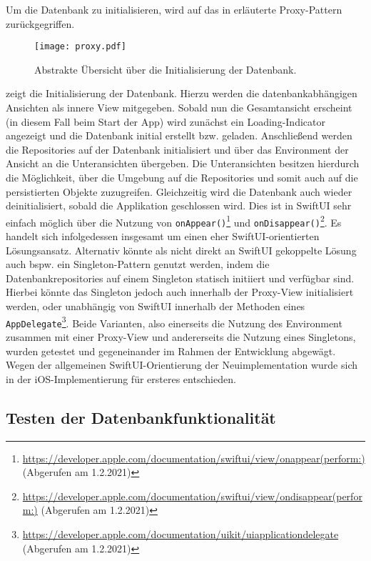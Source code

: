 Um die Datenbank zu initialisieren, wird auf das in  erläuterte Proxy-Pattern zurückgegriffen.

\begin{figure}[H]
\texttt{[image: proxy.pdf]}
\caption{Abstrakte Übersicht über die Initialisierung der Datenbank.}\label{fig:proxy}
\end{figure}

\noindent {} zeigt die Initialisierung der Datenbank. Hierzu werden die datenbankabhängigen Ansichten als innere View mitgegeben. Sobald nun die Gesamtansicht erscheint (in diesem Fall beim Start der App) wird zunächst ein Loading-Indicator angezeigt und die Datenbank initial erstellt bzw. geladen.  Anschließend werden die Repositories auf der Datenbank initialisiert und über das Environment der Ansicht an die Unteransichten übergeben. Die Unteransichten besitzen hierdurch die Möglichkeit, über die Umgebung auf die Repositories und somit auch auf die persistierten Objekte zuzugreifen. Gleichzeitig wird die Datenbank auch wieder deinitialisiert, sobald die Applikation geschlossen wird. Dies ist in SwiftUI sehr einfach möglich über die Nutzung von \texttt{onAppear()}\footnote{\url{https://developer.apple.com/documentation/swiftui/view/onappear(perform:)} (Abgerufen am 1.2.2021)} und \texttt{onDisappear()}\footnote{\url{https://developer.apple.com/documentation/swiftui/view/ondisappear(perform:)} (Abgerufen am 1.2.2021)}. Es handelt sich infolgedessen insgesamt um einen eher SwiftUI-orientierten Lösungsansatz. Alternativ könnte als nicht direkt an SwiftUI gekoppelte Lösung auch bspw. ein Singleton-Pattern genutzt werden, indem die Datenbankrepositories auf einem Singleton statisch initiiert und verfügbar sind. Hierbei könnte das Singleton jedoch auch innerhalb der Proxy-View initialisiert werden, oder unabhängig von SwiftUI innerhalb der Methoden eines \texttt{AppDelegate}\footnote{\url{https://developer.apple.com/documentation/uikit/uiapplicationdelegate} (Abgerufen am 1.2.2021)}. Beide Varianten, also einerseits die Nutzung des Environment zusammen mit einer Proxy-View und andererseits die Nutzung eines Singletons, wurden getestet und gegeneinander im Rahmen der Entwicklung abgewägt. Wegen der allgemeinen SwiftUI-Orientierung der Neuimplementation wurde sich in der iOS-Implementierung für ersteres entschieden.

\subsection{Testen der Datenbankfunktionalität}


